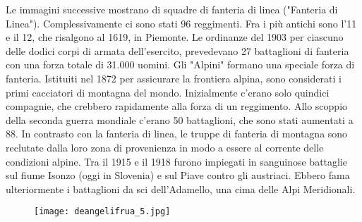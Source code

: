    Le immagini successive mostrano di squadre di fanteria di linea ("Fanteria di Linea"). Complessivamente ci sono stati 96 reggimenti. Fra i più antichi sono l'11 e il 12, che risalgono al 1619, in Piemonte. Le ordinanze del 1903 per ciascuno delle dodici corpi di armata dell'esercito, prevedevano 27 battaglioni di fanteria con una forza totale di 31.000 uomini. 
   Gli "Alpini" formano una speciale forza di fanteria. Istituiti nel 1872 per assicurare la frontiera alpina, sono considerati i primi cacciatori di montagna del mondo. Inizialmente c'erano solo quindici compagnie, che crebbero rapidamente alla forza di un reggimento. Allo scoppio della seconda guerra mondiale c'erano 50 battaglioni, che sono stati aumentati a 88. In contrasto con la fanteria di linea, le truppe di fanteria di montagna sono reclutate dalla loro zona di provenienza in modo a essere al corrente delle condizioni alpine. Tra il 1915 e il 1918 furono impiegati in sanguinose battaglie sul fiume Isonzo (oggi in Slovenia) e sul Piave contro gli austriaci. Ebbero fama ulteriormente i battaglioni da sci dell'Adamello, una cima delle Alpi Meridionali.
   
\newpage

\begin{figure}[h]
	\centering
		\texttt{[image: deangelifrua\_5.jpg]}
	\caption{}
	\label{fig:deangelifrua_5}
\end{figure}

